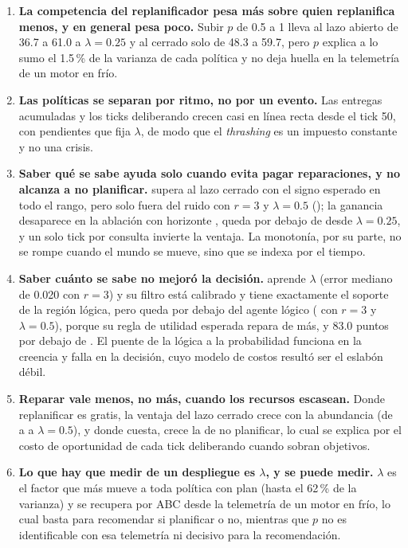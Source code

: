 \begin{enumerate}[leftmargin=1.8em, itemsep=0.35em]
  \item \textbf{La competencia del replanificador pesa más sobre quien replanifica menos, y en general pesa poco.} Subir $p$ de 0.5 a 1 lleva al lazo abierto de 36.7 a 61.0 a $\lambda=0.25$ y al cerrado solo de 48.3 a 59.7, pero $p$ explica a lo sumo el 1.5\,\% de la varianza de cada política y no deja huella en la telemetría de un motor en frío.
  \item \textbf{Las políticas se separan por ritmo, no por un evento.} Las entregas acumuladas y los ticks deliberando crecen casi en línea recta desde el tick 50, con pendientes que fija $\lambda$, de modo que el \emph{thrashing} es un impuesto constante y no una crisis.
  \item \textbf{Saber qué se sabe ayuda solo cuando evita pagar reparaciones, y no alcanza a no planificar.} \KB{} supera al lazo cerrado con el signo esperado en todo el rango, pero solo fuera del ruido con $r=3$ y $\lambda=0.5$ (); la ganancia desaparece en la ablación con horizonte \ahora, queda por debajo de \MB{} desde $\lambda=0.25$, y un solo tick por consulta invierte la ventaja. La monotonía, por su parte, no se rompe cuando el mundo se mueve, sino que se indexa por el tiempo.
  \item \textbf{Saber cuánto se sabe no mejoró la decisión.} \BY{} aprende $\lambda$ (error mediano de 0.020 con $r=3$) y su filtro está calibrado y tiene exactamente el soporte de la región lógica, pero queda por debajo del agente lógico ( con $r=3$ y $\lambda=0.5$), porque su regla de utilidad esperada repara de más, y 83.0 puntos por debajo de \MB. El puente de la lógica a la probabilidad funciona en la creencia y falla en la decisión, cuyo modelo de costos resultó ser el eslabón débil.
  \item \textbf{Reparar vale menos, no más, cuando los recursos escasean.} Donde replanificar es gratis, la ventaja del lazo cerrado crece con la abundancia (de  a  a $\lambda=0.5$), y donde cuesta, crece la de no planificar, lo cual se explica por el costo de oportunidad de cada tick deliberando cuando sobran objetivos.
  \item \textbf{Lo que hay que medir de un despliegue es $\lambda$, y se puede medir.} $\lambda$ es el factor que más mueve a toda política con plan (hasta el 62\,\% de la varianza) y se recupera por ABC desde la telemetría de un motor en frío, lo cual basta para recomendar si planificar o no, mientras que $p$ no es identificable con esa telemetría ni decisivo para la recomendación.
\end{enumerate}

